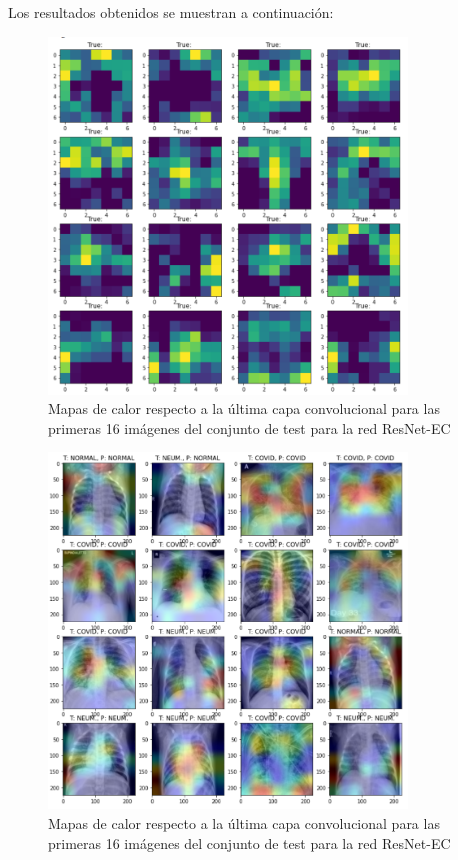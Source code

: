 \documentclass[11pt,a4paper]{article}
\theoremstyle{definition}
\begin{document}
Los resultados obtenidos se muestran a continuación:

\begin{figure}[]
\centering
\includegraphics[width=0.85\textwidth]{./images/resnetfilters}
\caption{Mapas de calor respecto a la última capa convolucional para las primeras 16 imágenes del conjunto de test para la red ResNet-EC}
\end{figure}

\begin{figure}[]
\centering
\includegraphics[width=0.85\textwidth]{./images/resnetheatmap}
\caption{Mapas de calor respecto a la última capa convolucional para las primeras 16 imágenes del conjunto de test para la red ResNet-EC}
\end{figure}
\end{document}
